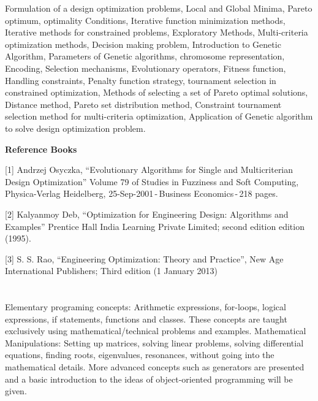 


Formulation of a design optimization problems, Local and Global Minima, Pareto optimum, optimality Conditions, Iterative function minimization methods, Iterative methods for constrained problems, Exploratory Methods, Multi-criteria optimization methods, Decision making problem, Introduction to Genetic Algorithm, Parameters of Genetic algorithms, chromosome representation, Encoding,  Selection mechanisms, Evolutionary operators, Fitness function, Handling constraints, Penalty function strategy, tournament selection in constrained optimization, Methods of selecting a set of Pareto optimal solutions, Distance method, Pareto set distribution method, Constraint tournament selection method for multi-criteria optimization, Application of Genetic algorithm to solve design optimization problem. 



 \textbf{Reference Books} 

[1] Andrzej Osyczka, “Evolutionary Algorithms for Single and Multicriterian Design Optimization” Volume 79 of Studies in Fuzziness and Soft Computing, Physica-Verlag Heidelberg,  25-Sep-2001 - Business Economics - 218 pages. 

[2] Kalyanmoy Deb, “Optimization for Engineering Design: Algorithms and Examples” Prentice Hall India Learning Private Limited; second edition edition (1995). 

[3] S. S. Rao, “Engineering Optimization: Theory and Practice”, New Age International Publishers; Third edition (1 January 2013) 

\section{\dsccourseinfo}

Elementary programing concepts: Arithmetic expressions, for-loops, logical expressions, if statements, functions and classes. These concepts are taught exclusively using mathematical/technical problems and examples. Mathematical Manipulations: Setting up matrices, solving linear problems, solving differential equations, finding roots, eigenvalues, resonances, without going into the mathematical details. More advanced concepts such as generators are presented and a basic introduction to the ideas of object-oriented programming will be given.

